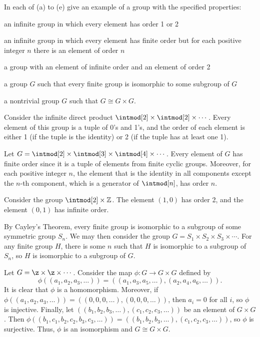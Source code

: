 \begin{exercise}\label{ex5.1.18}
    In each of (a) to (e) give an example of a group with the specified properties:
    \begin{subproblems}
        \item an infinite group in which every element has order 1 or 2
        \item an infinite group in which every element has finite order but for each positive integer $n$ there is an element of order $n$
        \item a group with an element of infinite order and an element of order 2
        \item a group $G$ such that every finite group is isomorphic to some subgroup of $G$
        \item a nontrivial group $G$ such that $G \cong G \times G$.
    \end{subproblems}
\end{exercise}

\begin{solalph}
    \item Consider the infinite direct product $\intmod[2] \times \intmod[2] \times \cdots$. Every element of this group is a tuple of 0's and 1's, and the order of each element is either 1 (if the tuple is the identity) or 2 (if the tuple has at least one 1).
    \item Let $G = \intmod[2] \times \intmod[3] \times \intmod[4] \times \cdots$. Every element of $G$ has finite order since it is a tuple of elements from finite cyclic groups. Moreover, for each positive integer $n$, the element that is the identity in all components except the $n$-th component, which is a generator of $\intmod[n]$, has order $n$.
    \item Consider the group $\intmod[2] \times \mathbb{Z}$. The element $(1, 0)$ has order 2, and the element $(0, 1)$ has infinite order.
    \item By Cayley's Theorem, every finite group is isomorphic to a subgroup of some symmetric group $S_n$. We may then consider the group $G = S_1 \times S_2 \times S_3 \times \cdots$. For any finite group $H$, there is some $n$ such that $H$ is isomorphic to a subgroup of $S_n$, so $H$ is isomorphic to a subgroup of $G$.
    \item Let $G = \z \times \z \times \cdots$. Consider the map $\phi : G \to G \times G$ defined by
    \[\phi((a_1, a_2, a_3, \ldots)) = ((a_1, a_3, a_5, \ldots), (a_2, a_4, a_6, \ldots)).\]
    It is clear that $\phi$ is a homomorphism. Moreover, if $\phi((a_1, a_2, a_3, \ldots)) = ((0, 0, 0, \ldots), (0, 0, 0, \ldots))$, then $a_i = 0$ for all $i$, so $\phi$ is injective. Finally, let $((b_1, b_2, b_3, \ldots), (c_1, c_2, c_3, \ldots))$ be an element of $G \times G$. Then $\phi((b_1, c_1, b_2, c_2, b_3, c_3, \ldots)) = ((b_1, b_2, b_3, \ldots), (c_1, c_2, c_3, \ldots))$, so $\phi$ is surjective. Thus, $\phi$ is an isomorphism and $G \cong G \times G$.
\end{solalph}

